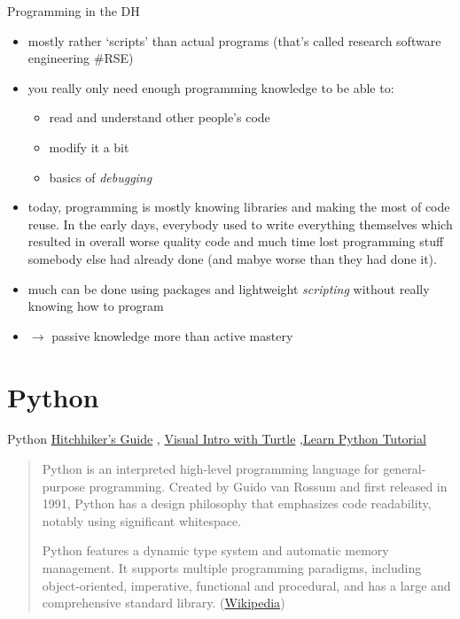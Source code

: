 \documentclass[10pt,a4paper]{article}
\begin{document}
\begin{multicols}{3}
\begin{textbox}{Programming in the DH}
\begin{itemize}
\item mostly rather `scripts' than actual programs (that's called research software engineering \#RSE)
\item you really only need enough programming knowledge to be able to:
\begin{itemize}
\item read and understand other people's code
\item modify it a bit
\item basics of \emph{debugging}
\end{itemize}
\item today, programming is mostly knowing libraries and making the most of code reuse. In the early days, everybody used to write everything themselves which resulted in overall worse quality code and much time lost programming stuff somebody else had already done (and mabye worse than they had done it).
\item much can be done using packages and lightweight \emph{scripting} without really knowing how to program 
\item $\to$ passive knowledge more than active mastery
\end{itemize}
\end{textbox}

\newpage
\section{Python}

\begin{textbox}{Python}
\href{https://docs.python-guide.org/}{Hitchhiker's Guide} \sep 
\href{https://hourofpython.trinket.io/a-visual-introduction-to-python#/welcome/an-hour-of-code}{Visual Intro with Turtle} \faBug \sep  \href{https://www.w3schools.com/python/python_intro.asp}{Learn Python Tutorial}
\begin{quote}
Python is an interpreted high-level programming language for general-purpose programming. Created by Guido van Rossum and first released in 1991, Python has a design philosophy that emphasizes code readability, notably using significant whitespace. \punkti

Python features a dynamic type system and automatic memory management. It supports multiple programming paradigms, including object-oriented, imperative, functional and procedural, and has a large and comprehensive standard library. (\href{https://en.wikipedia.org/wiki/Python_(programming_language)}{Wikipedia})
\end{quote}


\end{textbox}
\end{multicols}
\end{document}
